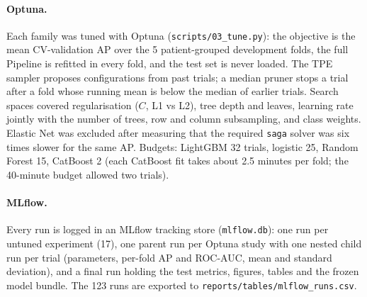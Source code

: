 \documentclass[11pt,a4paper]{article}
\newcommand{\code}[1]{\texttt{\small #1}}
\begin{document}
\paragraph{Optuna.} Each family was tuned with Optuna (\code{scripts/03\_tune.py}): the objective is the mean CV-validation AP over the 5 patient-grouped development folds, the full Pipeline is refitted in every fold, and the test set is never loaded. The TPE sampler proposes configurations from past trials; a median pruner stops a trial after a fold whose running mean is below the median of earlier trials. Search spaces covered regularisation ($C$, L1 vs L2), tree depth and leaves, learning rate jointly with the number of trees, row and column subsampling, and class weights. Elastic Net was excluded after measuring that the required \code{saga} solver was six times slower for the same AP. Budgets: LightGBM 32 trials, logistic 25, Random Forest 15, CatBoost 2 (each CatBoost fit takes about 2.5 minutes per fold; the 40-minute budget allowed two trials).

\paragraph{MLflow.} Every run is logged in an MLflow tracking store (\code{mlflow.db}): one run per untuned experiment (17), one parent run per Optuna study with one nested child run per trial (parameters, per-fold AP and ROC-AUC, mean and standard deviation), and a final run holding the test metrics, figures, tables and the frozen model bundle. The 123 runs are exported to \code{reports/tables/mlflow\_runs.csv}.

\begin{table}[H]
\centering\small
{}
\caption{Model progression: CV-validation scores on the development set (mean over the 5 folds; tuned models re-evaluated on the same folds).}
\label{tab:models}
\end{table}
\end{document}

